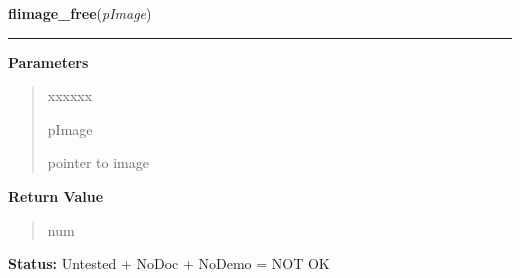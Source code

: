 \hspace{.8\funcindent}\begin{boxedminipage}{\funcwidth}

    \raggedright \textbf{flimage\_free}(\textit{pImage})

    \vspace{-1.5ex}

    \rule{\textwidth}{0.5\fboxrule}
\setlength{\parskip}{2ex}
\setlength{\parskip}{1ex}
      \textbf{Parameters}
      \vspace{-1ex}

      \begin{quote}
        \begin{Ventry}{xxxxxx}

          \item[pImage]

          pointer to image

        \end{Ventry}

      \end{quote}

      \textbf{Return Value}
    \vspace{-1ex}

      \begin{quote}
      num

      \end{quote}

\textbf{Status:} Untested + NoDoc + NoDemo = NOT OK



    \end{boxedminipage}

    \label{xformslib:flflimage:flimage_display}

    \vspace{0.5ex}

